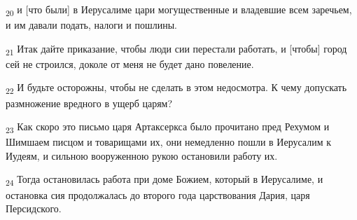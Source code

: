 \begin{tcolorbox}
\textsubscript{20} и [что были] в Иерусалиме цари могущественные и владевшие всем заречьем, и им давали подать, налоги и пошлины.
\end{tcolorbox}
\begin{tcolorbox}
\textsubscript{21} Итак дайте приказание, чтобы люди сии перестали работать, и [чтобы] город сей не строился, доколе от меня не будет дано повеление.
\end{tcolorbox}
\begin{tcolorbox}
\textsubscript{22} И будьте осторожны, чтобы не сделать в этом недосмотра. К чему допускать размножение вредного в ущерб царям?
\end{tcolorbox}
\begin{tcolorbox}
\textsubscript{23} Как скоро это письмо царя Артаксеркса было прочитано пред Рехумом и Шимшаем писцом и товарищами их, они немедленно пошли в Иерусалим к Иудеям, и сильною вооруженною рукою остановили работу их.
\end{tcolorbox}
\begin{tcolorbox}
\textsubscript{24} Тогда остановилась работа при доме Божием, который в Иерусалиме, и остановка сия продолжалась до второго года царствования Дария, царя Персидского.
\end{tcolorbox}
